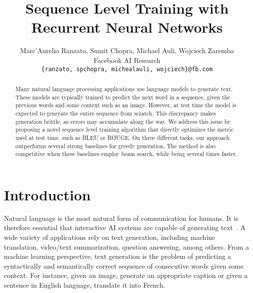 \documentclass{article} \usepackage{iclr2016_conference,times}
\title{Sequence Level Training with\\Recurrent Neural Networks}
\author{Marc'Aurelio Ranzato, Sumit Chopra, Michael Auli, Wojciech Zaremba \\
Facebook AI Research\\
\texttt{\{ranzato, spchopra, michealauli, wojciech\}@fb.com}
}
\begin{document}
\maketitle



\begin{abstract}
Many natural language processing applications use language models to generate text.
These models are typically trained to predict the next word in a sequence, given the previous words and some context such as an image. 
However, at test time the model is expected to generate the entire sequence from scratch. 
This discrepancy makes generation brittle, as errors may accumulate along the way. 
We address this issue by proposing a novel sequence level training algorithm that directly optimizes the metric used at test time, such as BLEU or ROUGE.
On three different tasks, our approach outperforms several strong baselines for greedy generation. The method is also competitive when these baselines employ beam search,
 while being several times faster. 
\end{abstract}

\section{Introduction}
Natural language is the most natural form of communication for humans. It is therefore essential that interactive AI systems are capable of generating text~\citep{textgen}.
A wide variety of applications rely on text generation, including machine translation, video/text summarization, question answering, among others. 
From a machine learning perspective, text generation is the problem of predicting a syntactically and semantically correct sequence of consecutive words given some context. For instance, given an image,  generate an appropriate caption or given a sentence in English language, translate it into French. 
\end{document}
